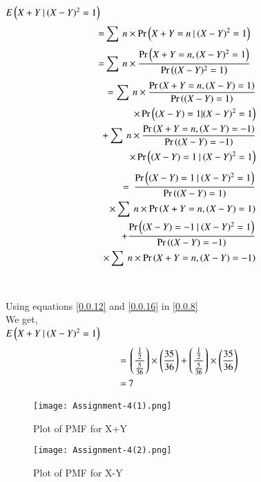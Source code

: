 \documentclass[journal,12pt,twocolumn]{IEEEtran}
\begin{document}
$E\left(X+Y\:|\:(X-Y)^2=1\right)$
\begin{align}
    =&\sum\:n\times\Pr\left(X+Y=n\:|\:(X-Y)^2=1\right)
\end{align}
\begin{align}
    =&\sum\:n\times\frac{\Pr\left(X+Y=n,(X-Y)^2=1\right)}{\Pr\left((X-Y)^2=1\right)}
\end{align}
\begin{align}
    \begin{split}
        =\sum\:n\times\frac{\Pr\brak{X+Y=n,(X-Y)=1}}{\Pr\brak{(X-Y)=1}}
        \bigskip\\
        \times\Pr\brak{(X-Y)=1|(X-Y)^2=1}
        \bigskip\\
        +\sum\:n\times\frac{\Pr\brak{X+Y=n,(X-Y)=-1}}{\Pr\brak{(X-Y)=-1}}
        \bigskip\\
        \times\Pr\brak{(X-Y)=1\:|\:(X-Y)^2=1}
    \end{split}
\end{align}
\begin{align}
    \begin{split}
        =\:\frac{\Pr\brak{(X-Y)=1\:|\:(X-Y)^2=1}}{\Pr\brak{(X-Y)=1}}
        \bigskip\\
        \times\sum\:n\times\Pr\brak{X+Y=n,(X-Y)=1}
        \bigskip\\
        +\frac{\Pr\brak{(X-Y)=-1\:|\:(X-Y)^2=1}}{\Pr\brak{(X-Y)=-1}}
        \bigskip\\
        \times\sum\:n\times\Pr\brak{X+Y=n,(X-Y)=-1}\label{0.0.8}
    \end{split}
\end{align}
\newline\\\\
Using equations \eqref{0.0.12} and \eqref{0.0.16} in \eqref{0.0.8}\\
We get,\\
\newline
$E\left(X+Y\:|\:(X-Y)^2=1\right)$
\begin{align}
    =&\:\left(\frac{\frac{1}{2}}{\frac{5}{36}}\right)\times\left(\frac{35}{36}\right)+\left(\frac{\frac{1}{2}}{\frac{5}{36}}\right)\times\left(\frac{35}{36}\right)\\
    =&\:7
\end{align}
\begin{figure}[htb]
    \texttt{[image: Assignment-4(1).png]}
    \caption{Plot of PMF for X+Y}
\end{figure}
\begin{figure}[htb]
    \texttt{[image: Assignment-4(2).png]}
    \caption{Plot of PMF for X-Y}
\end{figure}
\end{document}
